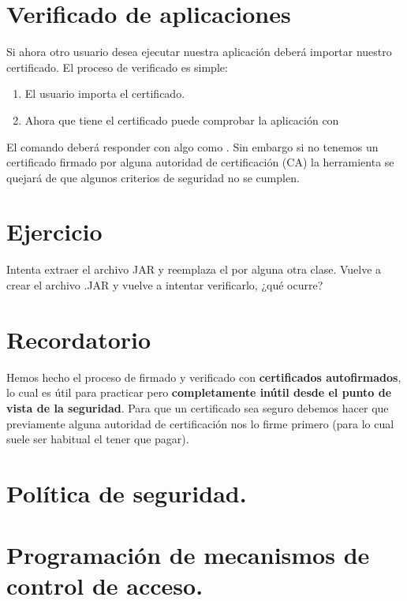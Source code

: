 \documentclass[a4paper,12pt,spanish]{sphinxmanual}
\begin{document}
\section{Verificado de aplicaciones}
\label{textos/tema5:verificado-de-aplicaciones}
Si ahora otro usuario desea ejecutar nuestra aplicación deberá importar nuestro certificado. El proceso de verificado es simple:
\begin{enumerate}
\item {} 
El usuario importa el certificado.

\item {} 
Ahora que tiene el certificado puede comprobar la aplicación con 

\end{enumerate}

El comando deberá responder con algo como . Sin embargo si no tenemos un certificado firmado por alguna autoridad de certificación (CA) la herramienta se quejará de que algunos criterios de seguridad no se cumplen.


\section{Ejercicio}
\label{textos/tema5:ejercicio}
Intenta extraer el archivo JAR y reemplaza el  por alguna otra clase. Vuelve a crear el archivo .JAR y vuelve a intentar verificarlo, ¿qué ocurre?


\section{Recordatorio}
\label{textos/tema5:recordatorio}
Hemos hecho el proceso de firmado y verificado con \textbf{certificados autofirmados}, lo cual es útil para practicar pero \textbf{completamente inútil desde el punto de vista de la seguridad}. Para que un certificado sea seguro debemos hacer que previamente alguna autoridad de certificación nos lo firme primero (para lo cual suele ser habitual el tener que pagar).


\section{Política de seguridad.}
\label{textos/tema5:politica-de-seguridad}

\section{Programación de mecanismos de control de acceso.}
\label{textos/tema5:programacion-de-mecanismos-de-control-de-acceso}
\end{document}
